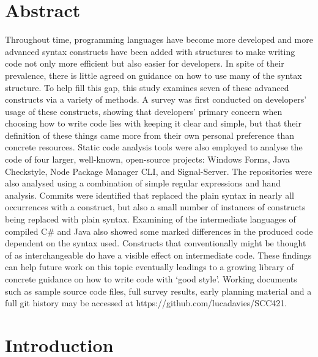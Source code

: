 \documentclass{article}
\def\mainmatter{%
    \pagenumbering{arabic}
    \setcounter{page}{1}
    \setcounter{section}{0}
    \renewcommand{\thesection}{\arabic{section}}
}%
\begin{document}
\section*{Abstract}
    Throughout time, programming languages have become more developed and more advanced syntax constructs have been added with structures to make writing code not only more efficient but also easier for developers. In spite of their prevalence, there is little agreed on guidance on how to use many of the syntax structure. To help fill this gap, this study examines seven of these advanced constructs via a variety of methods. A survey was first conducted on developers' usage of these constructs, showing that developers' primary concern when choosing how to write code lies with keeping it clear and simple, but that their definition of these things came more from their own personal preference than concrete resources. Static code analysis tools were also employed to analyse the code of four larger, well-known, open-source projects: Windows Forms, Java Checkstyle, Node Package Manager CLI, and Signal-Server. The repositories were also analysed using a combination of simple regular expressions and hand analysis. Commits were identified that replaced the plain syntax in nearly all occurrences with a construct, but also a small number of instances of constructs being replaced with plain syntax. Examining of the intermediate languages of compiled C\# and Java also showed some marked differences in the produced code dependent on the syntax used. Constructs that conventionally might be thought of as interchangeable do have a visible effect on intermediate code. These findings can help future work on this topic eventually leadings to a growing library of concrete guidance on how to write code with `good style'.
    \newline
    \newline
    Working documents such as sample source code files, full survey results, early planning material and a full git history may be accessed at https://github.com/lucadavies/SCC421.
    \newline
\newpage
\setcounter{tocdepth}{3}
\tableofcontents

\mainmatter
\newpage
\section{Introduction}
\end{document}
